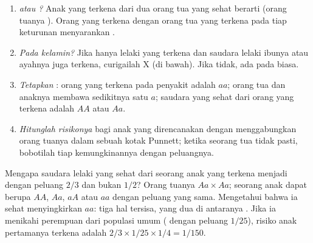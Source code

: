 \begin{method}\label{met:g11:genes-and-disease:analyse}
\begin{enumerate}
  \item \emph{ atau ?} Anak yang terkena dari dua orang
        tua yang sehat berarti  (orang tuanya ). Orang
        yang terkena dengan orang tua yang terkena pada tiap keturunan
        menyarankan .
  \item \emph{Pada  kelamin?} Jika hanya lelaki yang terkena
        dan saudara lelaki ibunya atau ayahnya juga terkena, curigailah
         X (di bawah). Jika tidak,  ada pada 
        biasa.
  \item \emph{Tetapkan }: orang yang terkena pada penyakit
         adalah $aa$; orang tua dan anaknya membawa sedikitnya
        satu $a$; saudara yang sehat dari orang yang terkena adalah
        $AA$ atau $Aa$.
  \item \emph{Hitunglah risikonya} bagi anak yang direncanakan dengan
        menggabungkan  orang tuanya dalam sebuah kotak Punnett;
        ketika  seorang tua tidak pasti, bobotilah tiap
        kemungkinannya dengan peluangnya.
\end{enumerate}
\end{method}

\begin{example}\label{ex:g11:genes-and-disease:twothirds}
Mengapa saudara lelaki yang sehat dari seorang anak yang terkena
menjadi  dengan peluang $2/3$ dan bukan $1/2$? Orang tuanya
$Aa \times Aa$; seorang anak dapat berupa $AA$, $Aa$, $aA$ atau $aa$
dengan peluang yang sama. Mengetahui bahwa ia sehat menyingkirkan $aa$:
tiga hal tersisa, yang dua di antaranya . Jika ia menikahi
perempuan dari populasi umum ( dengan peluang $1/25$), risiko
anak pertamanya terkena adalah $2/3 \times 1/25 \times 1/4 = 1/150$.
\end{example}

